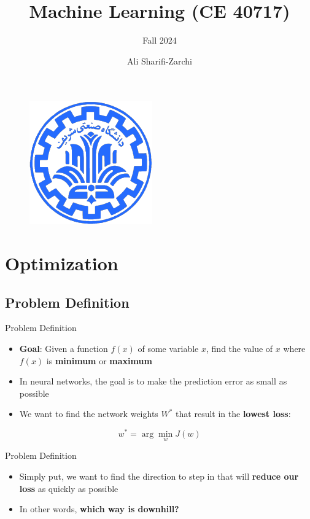 \documentclass[serif, aspectratio=169]{beamer}
\author{Ali Sharifi-Zarchi}
\title{Machine Learning (CE 40717)}
\subtitle{Fall 2024}
\institute{
    CE Department \\
    Sharif University of Technology
}
\begin{document}
\begin{frame}
    \titlepage
    \vspace*{-0.6cm}
    \begin{figure}[htpb]
        \begin{center}
            \includegraphics[keepaspectratio, scale=0.25]{pic/sharif-main-logo.png}
        \end{center}
    \end{figure}
\end{frame}

\begin{frame}    
\tableofcontents[sectionstyle=show,
subsectionstyle=show/shaded/hide,
subsubsectionstyle=show/shaded/hide]
\end{frame}

\section{Optimization}
\subsection{Problem Definition}

\begin{frame}{Problem Definition}
    \begin{itemize}%
        \item \textbf{Goal}: Given a function $f(x)$ of some variable $x$, find the value of $x$ where $f(x)$ is \textbf{minimum} or \textbf{maximum}
        \item In neural networks, the goal is to make the prediction error as small as possible
        \item We want to find the network weights $W^*$ that result in the \textbf{lowest loss}:
    \end{itemize}
    
    \[
    w^* = \arg\min_{w} J(w)
    \]


    
\end{frame}
\begin{frame}{Problem Definition}
    \begin{itemize}
        \item Simply put, we want to find the direction to step in that will \textbf{reduce our loss} as quickly as possible
        \item In other words, \textbf{which way is downhill?}
    \end{itemize}
\end{frame}
\end{document}
